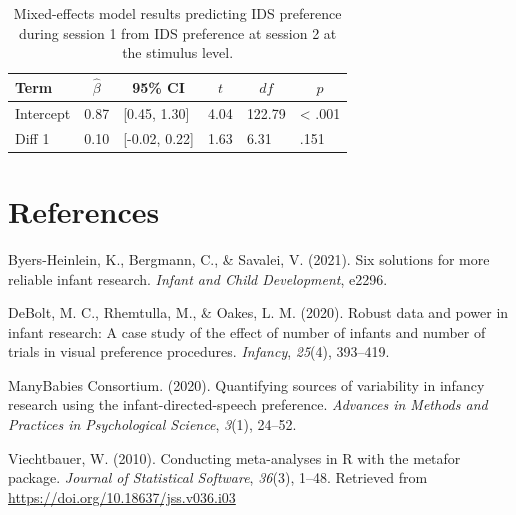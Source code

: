 \documentclass[
  man, donotrepeattitle,floatsintext]{apa6}
\newlength{\cslhangindent}
\newlength{\cslentryspacingunit} %
\newenvironment{CSLReferences}[2] %
 {%
  \setlength{\parindent}{0pt}
  \ifodd #1
  \let\oldpar\par
  \def\par{\hangindent=\cslhangindent\oldpar}
  \fi
  \setlength{\parskip}{#2\cslentryspacingunit}
 }%
 {}
\begin{document}
\begin{table}[tbp]

\begin{center}
\begin{threeparttable}

\caption{\label{tab:unnamed-chunk-20}Mixed-effects model results predicting IDS preference during session 1 from IDS preference at session 2 at the stimulus level.}

\begin{tabular}{llllll}
\toprule
Term & \multicolumn{1}{c}{$\hat{\beta}$} & \multicolumn{1}{c}{95\% CI} & \multicolumn{1}{c}{$t$} & \multicolumn{1}{c}{$\mathit{df}$} & \multicolumn{1}{c}{$p$}\\
\midrule
Intercept & 0.87 & {}[0.45, 1.30] & 4.04 & 122.79 & < .001\\
Diff 1 & 0.10 & {}[-0.02, 0.22] & 1.63 & 6.31 & .151\\
\bottomrule
\end{tabular}

\end{threeparttable}
\end{center}

\end{table}

\newpage

\hypertarget{references}{%
\section{References}\label{references}}

\begingroup
\setlength{\parindent}{-0.5in}
\setlength{\leftskip}{0.5in}

\hypertarget{refs}{}
\begin{CSLReferences}{1}{0}
\leavevmode{}%
Byers-Heinlein, K., Bergmann, C., \& Savalei, V. (2021). Six solutions for more reliable infant research. \emph{Infant and Child Development}, e2296.

\leavevmode{}%
DeBolt, M. C., Rhemtulla, M., \& Oakes, L. M. (2020). Robust data and power in infant research: A case study of the effect of number of infants and number of trials in visual preference procedures. \emph{Infancy}, \emph{25}(4), 393--419.

\leavevmode{}%
ManyBabies Consortium. (2020). Quantifying sources of variability in infancy research using the infant-directed-speech preference. \emph{Advances in Methods and Practices in Psychological Science}, \emph{3}(1), 24--52.

\leavevmode{}%
Viechtbauer, W. (2010). Conducting meta-analyses in {R} with the {metafor} package. \emph{Journal of Statistical Software}, \emph{36}(3), 1--48. Retrieved from \url{https://doi.org/10.18637/jss.v036.i03}

\end{CSLReferences}

\endgroup
\end{document}
